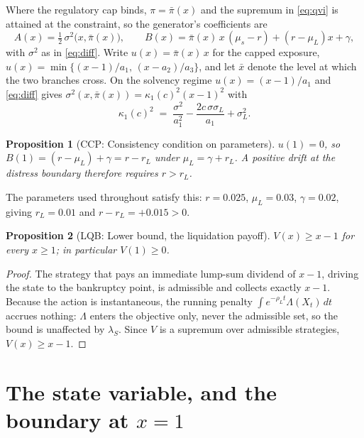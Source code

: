 \documentclass[11pt]{article}
\newtheorem{proposition}{Proposition}
\theoremstyle{remark}
\begin{document}
Where the regulatory cap binds, $\pi = \bar\pi(x)$ and the supremum in
\eqref{eq:qvi} is attained at the constraint, so the generator's
coefficients are
\begin{equation}
A(x) = \tfrac12\,\sigma^2\big(x,\bar\pi(x)\big),
\qquad
B(x) = \bar\pi(x)\,x\,(\mu_s-r) + (r-\mu_L)x + \gamma ,
\label{eq:capcoef}
\end{equation}
with $\sigma^2$ as in \eqref{eq:diff}. Write $u(x) = \bar\pi(x)\,x$ for the
capped exposure, $u(x) = \min\{(x-1)/a_1,\,(x-a_2)/a_3\}$, and let
$\bar x$ denote the level at which the two branches cross. On the solvency
regime $u(x) = (x-1)/a_1$ and \eqref{eq:diff} gives
$\sigma^2(x,\bar\pi(x)) = \kappa_1(c)^2 (x-1)^2$ with
\begin{equation}
\kappa_1(c)^2 \;=\; \frac{\sigma^2}{a_1^2}
   - \frac{2c\,\sigma\sigma_L}{a_1} + \sigma_L^2 .
\label{eq:kappa1c}
\end{equation}

\begin{proposition}[CCP: Consistency condition on parameters]
\label{prop:rrL}
$u(1)=0$, so $B(1) = (r-\mu_L) + \gamma = r - r_L$ under
$\mu_L = \gamma + r_L$. A positive drift at the distress boundary
therefore requires $r > r_L$.
\end{proposition}

\noindent
The parameters used throughout satisfy this: $r=0.025$, $\mu_L=0.03$,
$\gamma=0.02$, giving $r_L=0.01$ and $r-r_L=+0.015>0$.

\begin{proposition}[LQB: Lower bound, the liquidation payoff]
\label{prop:lowerbound}
$V(x) \ge x-1$ for every $x \ge 1$; in particular $V(1) \ge 0$.
\end{proposition}
\begin{proof}
The strategy that pays an immediate lump-sum dividend of $x-1$, driving
the state to the bankruptcy point, is admissible and collects exactly
$x-1$. Because the action is instantaneous, the running penalty
$\int e^{-\rho_L t}\Lambda(X_t)\,dt$ accrues nothing: $\Lambda$ enters the
objective only, never the admissible set, so the bound is unaffected by
$\lambda_S$. Since $V$ is a supremum over admissible strategies,
$V(x)\ge x-1$.
\end{proof}

\section{The state variable, and the boundary at \texorpdfstring{$x=1$}{x=1}}
\label{sec:statemap}
\end{document}
